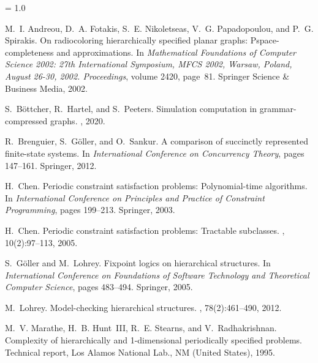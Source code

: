 \baselineskip = 1.0\normalbaselineskip
\begin{thebibliography}{HMRR93}

M.~I. Andreou, D.~A. Fotakis, S.~E. Nikoletseas, V.~G. Papadopoulou, and P.~G.
  Spirakis.
\newblock On radiocoloring hierarchically specified planar graphs:
  Pspace-completeness and approximations.
\newblock In {\em Mathematical Foundations of Computer Science 2002: 27th
  International Symposium, MFCS 2002, Warsaw, Poland, August 26-30, 2002.
  Proceedings}, volume 2420, page~81. Springer Science \& Business Media, 2002.


S.~B{\"o}ttcher, R.~Hartel, and S.~Peeters.
\newblock Simulation computation in grammar-compressed graphs.
, 2020.


R.~Brenguier, S.~G{\"o}ller, and O.~Sankur.
\newblock A comparison of succinctly represented finite-state systems.
\newblock In {\em International Conference on Concurrency Theory}, pages
  147--161. Springer, 2012.

H.~Chen.
\newblock Periodic constraint satisfaction problems: Polynomial-time
  algorithms.
\newblock In {\em International Conference on Principles and Practice of
  Constraint Programming}, pages 199--213. Springer, 2003.

H.~Chen.
\newblock Periodic constraint satisfaction problems: Tractable subclasses.
, 10(2):97--113, 2005.

S.~G{\"o}ller and M.~Lohrey.
\newblock Fixpoint logics on hierarchical structures.
\newblock In {\em International Conference on Foundations of Software
  Technology and Theoretical Computer Science}, pages 483--494. Springer, 2005.

M.~Lohrey.
\newblock Model-checking hierarchical structures.
, 78(2):461--490, 2012.

M.~V. Marathe, H.~B. Hunt~III, R.~E. Stearns, and V.~Radhakrishnan.
\newblock Complexity of hierarchically and 1-dimensional periodically specified
  problems.
\newblock Technical report, Los Alamos National Lab., NM (United States), 1995.




\end{thebibliography}
